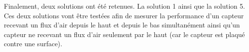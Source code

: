 Finalement, deux solutions ont été retenues. La solution 1 ainsi que la solution 5. Ces deux solutions vont être testées afin de mesurer la
performance d'un capteur recevant un flux d'air depuis le haut et depuis le bas simultanément ainsi qu'un capteur ne recevant un flux
d'air seulement par le haut (car le capteur est plaqué contre une surface).